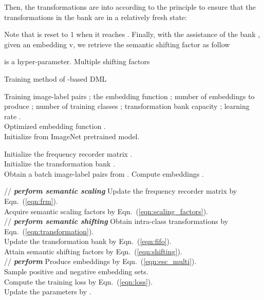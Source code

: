 \documentclass[runningheads]{llncs}
\begin{document}
Then, the transformations are  into  according to the  principle to ensure that the transformations in the bank are in a relatively fresh state:

Note that  is reset to 1 when it reaches . Finally, with the assistance of the bank , given an embedding v, we retrieve the semantic shifting factor as follow

 is a hyper-parameter. Multiple shifting factors 

\begin{algorithm}[t]
    \footnotesize{
    \caption{Training method of \shortname-based DML}
    \label{alg:esc_based_dml}
\begin{algorithmic}[1]
    \REQUIRE
    Training image-label pairs ;
    the embedding function ;
number of embeddings to produce ;
    number of training classes ;
    transformation bank capacity ; 
    learning rate . \\
    \ENSURE
    Optimized embedding function . \\
    \STATE Initialize  from ImageNet pretrained model. 
    
    \STATE Initialize the frequency recorder matrix . \\
    \STATE Initialize the transformation bank . \\
    
        \STATE Obtain a batch image-label pairs  from .
        \STATE Compute embeddings .
        
        \STATE // \textbf{\emph{{perform semantic scaling }}}
        \STATE Update the frequency recorder matrix  by Eqn.~(\ref{eqn:frm}). \\
        \STATE Acquire semantic scaling factors  by Eqn.~(\ref{eqn:scaling_factors}). \\
        \STATE // \textbf{\emph{{perform semantic shifting }}}
        \STATE Obtain intra-class transformations  by Eqn.~(\ref{eqn:transformation}). \\
        \STATE Update the transformation bank  by Eqn.~(\ref{eqn:fifo}). \\
        \STATE Attain semantic shifting factors  by Eqn.~(\ref{eqn:shifting}). \\
        \STATE // \textbf{\emph{{perform \lowername}}}
        \STATE Produce embeddings  by Eqn.~(\ref{eqn:esc_multi}). \\
        
\STATE Sample positive and negative embedding sets. \\

        \STATE Compute the training loss  by Eqn.~(\ref{eqn:loss}). \\
        \STATE Update the parameters  by . \\
\ENDWHILE
    \end{algorithmic}
    }
\end{algorithm}
\end{document}
